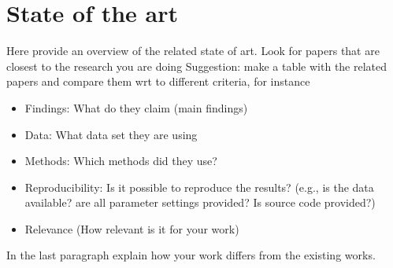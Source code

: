 \chapter{State of the art} \label{sec.state_of_art}

Here provide an overview of the related state of art. Look for papers that are closest to the research you are doing
Suggestion: make a table with the related papers and compare them wrt to different criteria, for instance

\begin{itemize}
	\item Findings: What do they claim (main findings)
	\item Data: What data set they are using
	\item Methods: Which methods did they use?
	\item Reproducibility: Is it possible to reproduce the results? (e.g., is the data available? are all parameter settings provided? Is source code provided?)
	\item Relevance (How relevant is it for your work)
\end{itemize}


In the last paragraph explain how your work differs from the existing works.



\newpage
